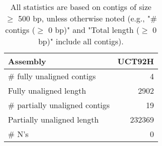 \documentclass[12pt,a4paper]{article}
\begin{document}
\begin{table}[ht]
\begin{center}
\caption{All statistics are based on contigs of size $\geq$ 500 bp, unless otherwise noted (e.g., "\# contigs ($\geq$ 0 bp)" and "Total length ($\geq$ 0 bp)" include all contigs).}
\begin{tabular}{|l*{1}{|r}|}
\hline
Assembly & UCT92H \\ \hline
\# fully unaligned contigs & 4 \\ \hline
Fully unaligned length & 2902 \\ \hline
\# partially unaligned contigs & 19 \\ \hline
Partially unaligned length & 232369 \\ \hline
\# N's & 0 \\ \hline
\end{tabular}
\end{center}
\end{table}
\end{document}
